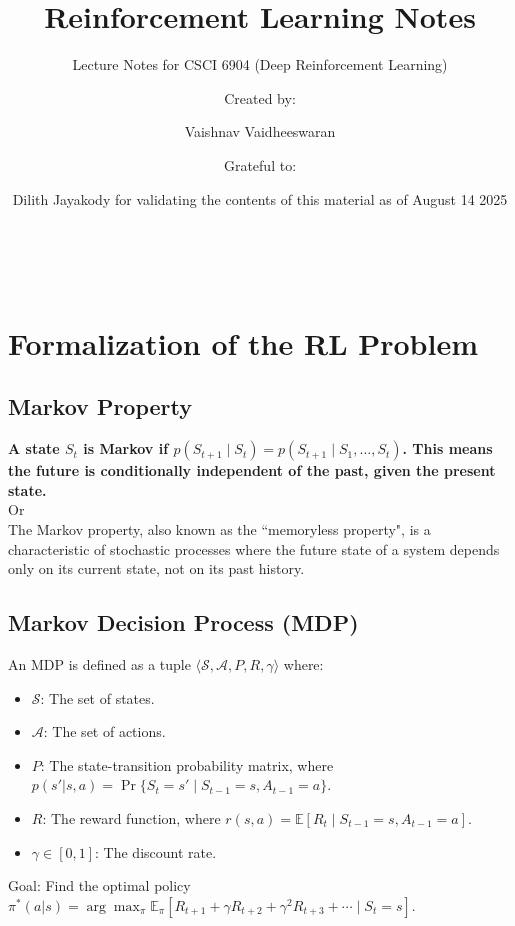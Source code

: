 \documentclass[12pt]{article}
\title{Reinforcement Learning Notes}
\author{Lecture Notes for CSCI 6904 (Deep Reinforcement Learning)}
\begin{document}
\maketitle
\begin{center}
    \author{Created by:}
    \author{Vaishnav Vaidheeswaran}\\
    \author{Grateful to:}
    \author{Dilith Jayakody for validating the contents of this material as of August 14 2025}
\end{center}

\tableofcontents

\newpage

\section{Formalization of the RL Problem }


\subsection{Markov Property}
\textbf{A state $S_t$ is Markov if $p(S_{t+1} \mid S_t) = p(S_{t+1} \mid S_1, \dots, S_t)$. This means the future is conditionally independent of the past, given the present state.} \\
Or \\
The Markov property, also known as the ``memoryless property", is a characteristic of stochastic processes where the future state of a system depends only on its current state, not on its past history.

\subsection{Markov Decision Process (MDP)}
An MDP is defined as a tuple $\langle \mathcal{S}, \mathcal{A}, P, R, \gamma \rangle$ where:
\begin{itemize}
    \item $\mathcal{S}$: The set of states.
    \item $\mathcal{A}$: The set of actions.
    \item $P$: The state-transition probability matrix, where $p(s'|s,a) = \Pr\{S_t = s' \mid S_{t-1} = s, A_{t-1} = a\}$.
    \item $R$: The reward function, where $r(s,a) = \mathbb{E}[R_t \mid S_{t-1} = s, A_{t-1} = a]$.
    \item $\gamma \in [0,1]$: The discount rate.
\end{itemize}
Goal: Find the optimal policy $\pi^*(a|s) = \arg\max_\pi \mathbb{E}_\pi [R_{t+1} + \gamma R_{t+2} + \gamma^2 R_{t+3} + \cdots \mid S_t = s]$.
\end{document}
